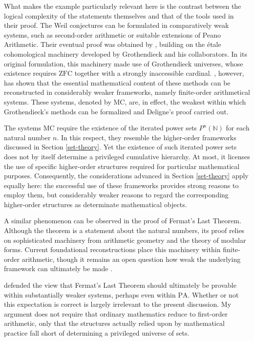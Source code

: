 \documentclass[11pt,a4paper]{book}
\theoremstyle{plain}
\begin{document}
What makes the example particularly relevant here is the contrast between the logical complexity of the statements themselves and that of the tools used in their proof. The Weil conjectures can be formulated in comparatively weak systems, such as second-order arithmetic or suitable extensions of Peano Arithmetic. Their eventual proof was obtained by \textcite{Deligne1974}, building on the étale cohomological machinery developed by Grothendieck and his collaborators. In its original formulation, this machinery made use of Grothendieck universes, whose existence requires $\mathrm{ZFC}$ together with a strongly inaccessible cardinal. \textcite{McLarty2020}, however, has shown that the essential mathematical content of these methods can be reconstructed in considerably weaker frameworks, namely finite-order arithmetical systems. These systems, denoted by $\mathrm{MC}$, are, in effect, the weakest within which Grothendieck's methods can be formalized and Deligne's proof carried out.

The systems $\mathrm{MC}$ require the existence of the iterated power sets $P^n(\mathbb N)$ for each natural number $n$. In this respect, they resemble the higher-order frameworks discussed in Section \ref{set-theory}. Yet the existence of such iterated power sets does not by itself determine a privileged cumulative hierarchy. At most, it licenses the use of specific higher-order structures required for particular mathematical purposes. Consequently, the considerations advanced in Section \ref{set-theory} apply equally here: the successful use of these frameworks provides strong reasons to employ them, but considerably weaker reasons to regard the corresponding higher-order structures as determinate mathematical objects.

A similar phenomenon can be observed in the proof of Fermat's Last Theorem. Although the theorem is a statement about the natural numbers, its proof relies on sophisticated machinery from arithmetic geometry and the theory of modular forms. Current foundational reconstructions place this machinery within finite-order arithmetic, though it remains an open question how weak the underlying framework can ultimately be made \parencite[17]{McLarty2020}. 

\textcite{Feferman1999} defended the view that Fermat's Last Theorem should ultimately be provable within substantially weaker systems, perhaps even within $\mathrm{PA}$. Whether or not this expectation is correct is largely irrelevant to the present discussion. My argument does not require that ordinary mathematics reduce to first-order arithmetic, only that the structures actually relied upon by mathematical practice fall short of determining a privileged universe of sets.
\end{document}
